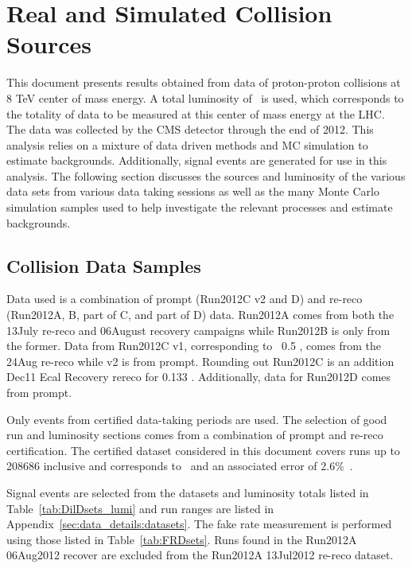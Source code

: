 \chapter{Real and Simulated Collision Sources}
\label{ch:samples}
This document presents results obtained from data of proton-proton collisions at 8 TeV center of mass energy. A total luminosity of \intLumi \ is used, which corresponds to the totality of data to be measured at this center of mass energy at the LHC. The data was collected by the CMS detector through the end of 2012. This analysis relies on a mixture of data driven methods and MC simulation to estimate backgrounds. Additionally, signal events are generated for use in this analysis. The following section discusses the sources and luminosity of the various data sets from various data taking sessions as well as the many Monte Carlo simulation samples used to help investigate the relevant processes and estimate backgrounds.\\


\section{Collision Data Samples}
		
	
	Data used is a combination of prompt (Run2012C v2 and D) and re-reco (Run2012A, B, part of C, and part of D) data.  
Run2012A comes from both the 13July re-reco and 06August recovery campaigns while Run2012B is only from the former.  
Data from Run2012C v1, corresponding to ~0.5 \fbinv, comes from the 24Aug re-reco while v2 is from prompt. Rounding out Run2012C is an addition Dec11 Ecal Recovery rereco for 0.133 \fbinv. Additionally, data for Run2012D comes from prompt.
    
Only events from certified data-taking periods are used.  
The selection of good run and luminosity sections comes from a combination of prompt and re-reco certification.  
The certified dataset considered in this document covers runs up to 208686 inclusive and corresponds to \intLumi \ and an associated error of 2.6\%~\cite{lumi12up}. 


	
	
	
Signal events are selected from the datasets and luminosity totals listed in Table~\ref{tab:DilDsets_lumi} and run ranges are listed in Appendix~\ref{sec:data_details:datasets}.  The fake rate measurement is performed using those listed in Table~\ref{tab:FRDsets}.  Runs found in the Run2012A 06Aug2012 recover are excluded from the Run2012A 13Jul2012 re-reco dataset. 

